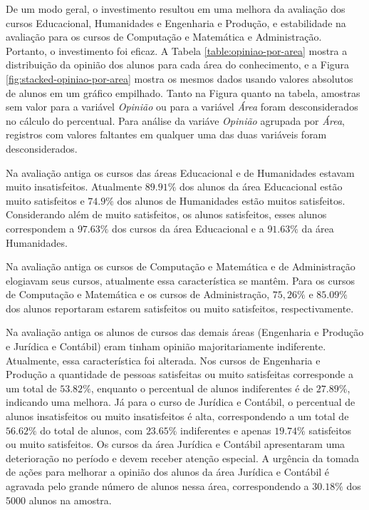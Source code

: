 \documentclass[10pt,a4paper,oneside]{article}
\newcommand{\adm}{Administração\xspace}
\newcommand{\comp}{Computação e Matemática\xspace}
\newcommand{\edu}{Educacional\xspace}
\newcommand{\eng}{Engenharia e Produção\xspace}
\newcommand{\hum}{Humanidades\xspace}
\newcommand{\jur}{Jurídica e Contábil\xspace}
\begin{document}
De um modo geral, o investimento resultou em uma melhora da avaliação dos cursos \edu, \hum e \eng, e estabilidade na avaliação para os cursos de \comp e \adm. Portanto, o investimento foi eficaz. A Tabela \ref{table:opiniao-por-area} mostra a distribuição da opinião dos alunos para cada área do conhecimento, e a Figura \ref{fig:stacked-opiniao-por-area} mostra os mesmos dados usando valores absolutos de alunos em um gráfico empilhado. Tanto na Figura quanto na tabela, amostras sem valor para a variável \textit{Opinião} ou para a variável \textit{Área} foram desconsiderados no cálculo do percentual. Para análise da variáve \textit{Opinião} agrupada por \textit{Área}, registros com valores faltantes em qualquer uma das duas variáveis foram desconsiderados.

Na avaliação antiga  os cursos das áreas \edu e de \hum estavam muito insatisfeitos. Atualmente $89.91\%$ dos alunos da área \edu estão muito satisfeitos e $74.9\%$ dos alunos de \hum estão muitos satisfeitos. Considerando além de muito satisfeitos, os alunos satisfeitos, esses alunos correspondem a $97.63\%$ dos cursos da área \edu e a $91.63\%$ da área \hum.

Na avaliação antiga os cursos de \comp e de \adm elogiavam seus cursos, atualmente essa característica se mantêm. Para os cursos de \comp e os cursos de \adm, $75,26\%$ e $85.09\%$ dos alunos reportaram estarem satisfeitos ou muito satisfeitos, respectivamente.

Na avaliação antiga os alunos de cursos das demais áreas (\eng e \jur) eram tinham opinião majoritariamente indiferente. Atualmente, essa característica foi alterada. Nos cursos de \eng a quantidade de pessoas satisfeitas ou muito satisfeitas corresponde a um total de $53.82\%$, enquanto o percentual de alunos indiferentes é de $27.89\%$, indicando uma melhora. Já para o curso de Jurídica e Contábil, o percentual de alunos insatisfeitos ou muito insatisfeitos é alta, correspondendo a um total de $56.62\%$ do total de alunos, com $23.65\%$ indiferentes e apenas $19.74\%$ satisfeitos ou muito satisfeitos. Os cursos da área  \jur apresentaram uma deterioração no período e devem receber atenção especial. A urgência da tomada de ações para melhorar a opinião dos alunos da área \jur é agravada pelo grande número de alunos nessa área, correspondendo a  $30.18\%$ dos 5000 alunos na amostra.
\end{document}
